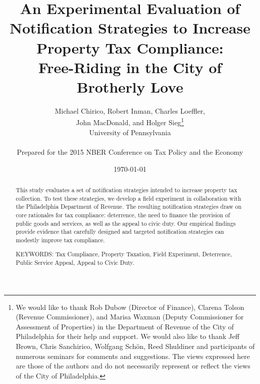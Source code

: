 \documentclass[12pt,titlepage]{article}
\renewcommand{\thefootnote}{\fnsymbol{footnote}}
\begin{document}
\title{An Experimental Evaluation of Notification Strategies to
  Increase Property Tax Compliance: \\ Free-Riding in the City of
  Brotherly Love} \author{Michael Chirico, Robert Inman, Charles
  Loeffler, \\ John MacDonald, and Holger Sieg\thanks{We would like to
    thank Rob Dubow (Director of Finance), Clarena Tolson (Revenue
    Commissioner), and Marisa Waxman (Deputy Commissioner for
    Assessment of Properties) in the Department of Revenue of the City
    of Philadelphia for their help and support. We would also like to
    thank Jeff Brown, Chris Sanchirico, Wolfgang Sch\"on, Reed
    Shuldiner and participants of numerous seminars for comments and
    suggestions. The views expressed here are those of the authors and
    do not necessarily represent or reflect the views of the City of
    Philadelphia.}  \\ University of Pennsylvania \\ \\ Prepared for
  the 2015 NBER Conference on Tax Policy and the Economy}
  
  \date{\today}

\maketitle

\begin{abstract}

This study evaluates a set of notification strategies intended to
increase property tax collection. To test these strategies, we develop
a field experiment in collaboration with the Philadelphia Department
of Revenue.  The resulting notification strategies draw on core
rationales for tax compliance: deterrence, the need to finance the
provision of public goods and services, as well as the appeal to civic
duty. Our empirical findings provide evidence that carefully designed
and targeted notification strategies can modestly improve tax
compliance.

\noindent KEYWORDS: Tax Compliance, Property Taxation, Field
Experiment, Deterrence, Public Service Appeal, Appeal to Civic Duty.

\end{abstract}

\newpage

\renewcommand{\thefootnote}{\arabic{footnote}}

\renewcommand{\thefootnote}{\arabic{footnote}}
\end{document}
